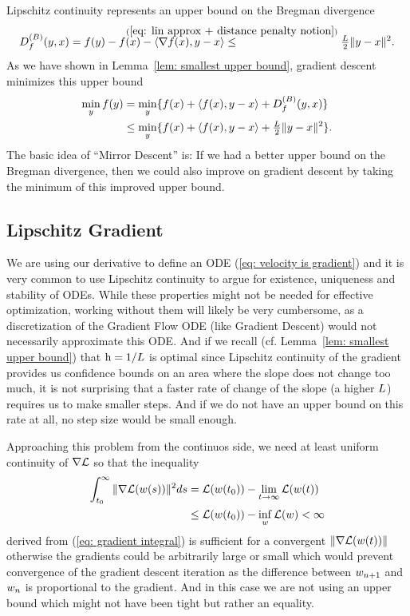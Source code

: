 Lipschitz continuity represents an upper bound on the Bregman divergence
\begin{align*}
	\bregmanDiv{f}(y,x)
	= f(y) - f(x) - \langle\nabla f(x), y-x\rangle
	\lxle{(\ref{eq: lin approx + distance penalty notion})}
	\tfrac{\ubound}{2} \|y-x\|^2.
\end{align*}
As we have shown in Lemma~\ref{lem: smallest upper bound}, gradient descent
minimizes this upper bound
\begin{align*}
	\min_y f(y)
	&= \min_y \{f(x) + \langle f(x), y-x\rangle +D^{(B)}_{f}(y,x)\} \\
	&\le \min_y\{f(x) + \langle f(x), y-x\rangle +\tfrac{L}{2} \|y-x\|^2\}.
\end{align*}
The basic idea of ``Mirror Descent'' \parencite[
e.g.][]{guptaAdvancedAlgorithmsFall2020,chenLargeScaleOptimizationData2019,bubeckConvexOptimizationAlgorithms2015}
is: If we had a better upper bound on the Bregman divergence, then we could also
improve on
gradient descent by taking the minimum of this improved upper bound.

\subsection{Lipschitz Gradient}

We are using our derivative to define an ODE (\ref{eq: velocity is
gradient}) and it is very common to use Lipschitz continuity to argue for
existence, uniqueness and stability of ODEs. While these
properties might not be needed for effective optimization, working without them
will likely be very cumbersome, as a discretization of the Gradient Flow ODE
(like Gradient Descent) would not necessarily approximate this ODE. And if we
recall (cf. Lemma~\ref{lem: smallest upper bound}) that \(\text{h}=1/L\) is
optimal since Lipschitz continuity of the gradient provides us confidence
bounds on an area where the slope does not change too much, it is not surprising
that a faster rate of change of the slope (a higher \(L\)) requires us
to make smaller steps. And if we do not have an upper bound on this rate at all,
no step size would be small enough.

Approaching this problem from the continuos side, we need at least uniform
continuity of \(\nabla \mathcal{L}\) so that the inequality
%
\begin{align}\label{eq: bounded gradient integral}
	\int_{t_0}^\infty \|\nabla \mathcal{L}(w(s))\|^2 ds
	&= \mathcal{L}(w(t_0)) - \lim_{t\to\infty} \mathcal{L}(w(t)) \\
	&\le \mathcal{L}(w(t_0)) - \inf_{w} \mathcal{L}(w) < \infty \nonumber
\end{align}
%
derived from (\ref{eq: gradient integral}) is sufficient for a convergent
\(\|\nabla \mathcal{L}(w(t))\|\) otherwise the gradients could be arbitrarily
large or small which would prevent convergence of the gradient descent iteration as
the difference between \(w_{n+1}\) and \(w_n\) is proportional to
the gradient. And in this case we are not using an upper bound which might
not have been tight but rather an equality.

